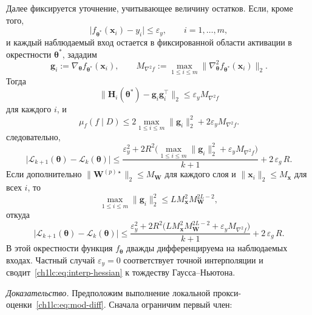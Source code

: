 \begin{theorem}
Далее фиксируется уточнение, учитывающее величину остатков.
Если, кроме того,
\[
  \bigl|f_{\boldsymbol{\theta}^*}(\mathbf{x}_i)-y_i\bigr|\le \varepsilon_y,
  \qquad i=1,\dots,m,
\]
и каждый наблюдаемый вход остается в фиксированной области активации в окрестности $\boldsymbol{\theta}^*$, зададим
\[
  \mathbf{g}_i:=\nabla_{\boldsymbol{\theta}}f_{\boldsymbol{\theta}^*}(\mathbf{x}_i),
  \qquad
  M_{\nabla^2 f}:=
  \max_{1\le i\le m}\bigl\|\nabla_{\boldsymbol{\theta}}^2 f_{\boldsymbol{\theta}^*}(\mathbf{x}_i)\bigr\|_2 .
\]
Тогда
\begin{equation}\label{ch1lc:eq:interp-hessian}
  \bigl\|
    \mathbf{H}_i(\boldsymbol{\theta}^*)
    - \mathbf{g}_i\mathbf{g}_i^\top
  \bigr\|_2
  \le \varepsilon_y M_{\nabla^2 f}
\end{equation}
для каждого $i$, и
\begin{equation}\label{ch1lc:eq:muf-interp-general}
  \mu_f(f\mid D)\le
  2\max_{1\le i\le m}\|\mathbf{g}_i\|_2^2
  + 2\varepsilon_y M_{\nabla^2 f} .
\end{equation}
следовательно,
\begin{equation}\label{ch1lc:eq:thm-bound-interp}
  \bigl|\mathcal{L}_{k+1}(\boldsymbol{\theta}) - \mathcal{L}_k(\boldsymbol{\theta})\bigr|
  \le
  \frac{\varepsilon_y^2 + 2R^2\bigl(\max_{1\le i\le m}\|\mathbf{g}_i\|_2^2 + \varepsilon_y M_{\nabla^2 f}\bigr)}{k+1}
  + 2\,\varepsilon_g\,R .
\end{equation}
Если дополнительно $\|\mathbf{W}^{(p)\star}\|_2\le M_{\mathbf{W}}$ для каждого слоя и $\|\mathbf{x}_i\|_2\le M_{\mathbf{x}}$ для всех $i$, то
\begin{equation}\label{ch1lc:eq:grad-interp-general}
  \max_{1\le i\le m}\|\mathbf{g}_i\|_2^2
  \le L M_{\mathbf{x}}^2 M_{\mathbf{W}}^{2L-2},
\end{equation}
откуда
\begin{equation}\label{ch1lc:eq:rate-interp}
  \bigl|\mathcal{L}_{k+1}(\boldsymbol{\theta}) - \mathcal{L}_k(\boldsymbol{\theta})\bigr|
  \le
  \frac{\varepsilon_y^2 + 2R^2\bigl(L M_{\mathbf{x}}^2 M_{\mathbf{W}}^{2L-2} + \varepsilon_y M_{\nabla^2 f}\bigr)}{k+1}
  + 2\,\varepsilon_g\,R .
\end{equation}
В этой окрестности функция $f_{\boldsymbol{\theta}}$ дважды дифференцируема на наблюдаемых входах. Частный случай $\varepsilon_y=0$ соответствует точной интерполяции и сводит~\eqref{ch1lc:eq:interp-hessian} к тождеству Гаусса--Ньютона.
\end{theorem}
\label{ch1lc:app:proof-thm-landscape}
\noindent\textit{Доказательство.} Предположим выполнение локальной прокси-оценки~\eqref{ch1lc:eq:mod-diff}. Сначала ограничим первый член:
